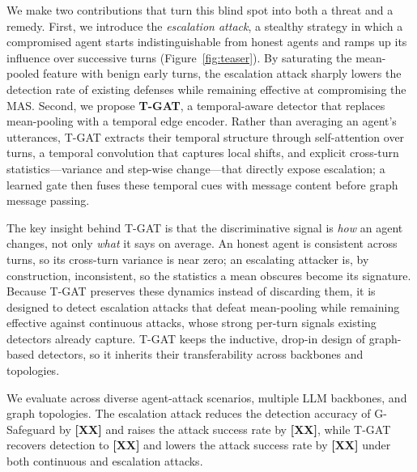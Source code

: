 We make two contributions that turn this blind spot into both a threat and a
remedy. First, we introduce the \emph{escalation attack}, a stealthy strategy in
which a compromised agent starts indistinguishable from honest agents and ramps
up its influence over successive turns (Figure~\ref{fig:teaser}). By saturating
the mean-pooled feature with benign early turns, the escalation attack sharply
lowers the detection rate of existing defenses while remaining effective at
compromising the MAS. Second, we propose \textbf{T-GAT}, a temporal-aware
detector that replaces mean-pooling with a temporal edge encoder. Rather than
averaging an agent's utterances, T-GAT extracts their temporal structure through
self-attention over turns, a temporal convolution that captures local shifts, and
explicit cross-turn statistics---variance and step-wise change---that directly
expose escalation; a learned gate then fuses these temporal cues with message
content before graph message passing.

The key insight behind T-GAT is that the discriminative signal is \emph{how} an
agent changes, not only \emph{what} it says on average. An honest agent is
consistent across turns, so its cross-turn variance is near zero; an escalating
attacker is, by construction, inconsistent, so the statistics a mean obscures
become its signature. Because T-GAT preserves these dynamics instead of discarding
them, it is designed to detect escalation attacks that defeat mean-pooling while
remaining effective against continuous attacks, whose strong per-turn signals
existing detectors already capture. T-GAT keeps the inductive, drop-in design of
graph-based detectors, so it inherits their transferability across backbones and
topologies.

We evaluate across diverse agent-attack scenarios, multiple LLM backbones, and
graph topologies. The escalation attack reduces the detection accuracy of
G-Safeguard by \textbf{[XX]} and raises the attack success rate by \textbf{[XX]},
while T-GAT recovers detection to \textbf{[XX]} and lowers the attack success rate
by \textbf{[XX]} under both continuous and escalation attacks.

